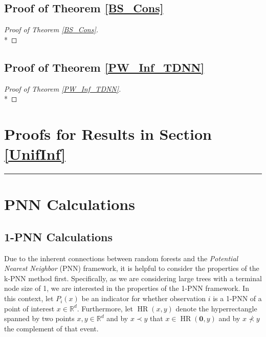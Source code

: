 \documentclass[letterpaper,10pt]{article}
\numberwithin{equation}{section}
\numberwithin{thm}{section}
\numberwithin{lem}{section}
\numberwithin{cor}{section}
\newcommand{\1}{\mathbb{1}}
\begin{document}
\subsection{Proof of Theorem \ref{BS_Cons}}
\begin{proof}[Proof of Theorem \ref{BS_Cons}]\mbox{}\\*

\end{proof}

\subsection{Proof of Theorem \ref{PW_Inf_TDNN}}
\begin{proof}[Proof of Theorem \ref{PW_Inf_TDNN}]\mbox{}\\*

\end{proof}

\section{Proofs for Results in Section \ref{UnifInf}}
\hrule

\section{PNN Calculations}
\subsection{1-PNN Calculations}

Due to the inherent connections between random forests and the \textit{Potential Nearest Neighbor} (PNN) framework, it is helpful to consider the properties of the k-PNN method first.
Specifically, as we are considering large trees with a terminal node size of 1, we are interested in the properties of the 1-PNN framework.
In this context, let $P_i(x)$ be an indicator for whether observation $i$ is a 1-PNN of a point of interest $x \in \mathbb{R}^d$.
Furthermore, let $\operatorname{HR}(x,y)$ denote the hyperrectangle spanned by two points $x,y \in \mathbb{R}^d$ and by $x \prec y$ that $x \in \operatorname{HR}(\mathbf{0}, y)$ and by $x \not\prec y$ the complement of that event.
\end{document}
